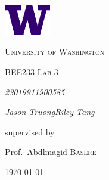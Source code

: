 \documentclass[9pt,a4paper]{report}
\begin{document}
	\begin{titlepage}
		\centering
		\vspace*{1.5in}
		\includegraphics[width=0.15\textwidth]{W-Logo_Purple_RGB}\par\vspace{1cm}
		{\LARGE \textsc{University of Washington}\par}
		\vspace{1cm}
		{\Large \textsc{BEE233 Lab 3}\par}
		\vspace{1.5cm}
		{\huge\bfseries \par}
		\vspace{2cm}
		{\Large\itshape 2301991\hspace{55pt}1900585\par}
		{\Large\itshape Jason Truong\hspace{31pt}Riley Tang\par}
		\vfill
		supervised by\par
		Prof.~Abdlmagid \textsc{Basere}
		\date{2024\\ January}
		\vfill
		{\large \today\par}
		\vspace*{1.5in}
	\end{titlepage}
\end{document}
